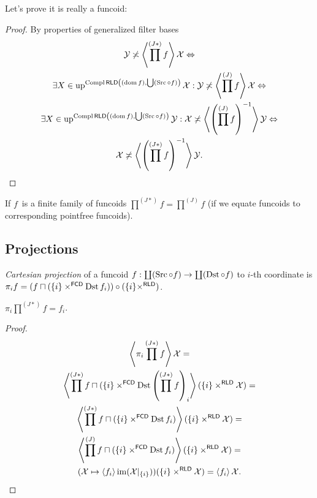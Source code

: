 Let's prove it is really a funcoid:

\begin{proof}
By properties of generalized filter bases
\begin{multline*}
\mathcal{Y}\not\asymp\left\langle \prod^{(J\ast)} f\right\rangle\mathcal{X}
\Leftrightarrow\\
\exists X\in\operatorname{up}^{\operatorname{Compl}\mathsf{RLD}\left((\operatorname{dom} f),\bigcup(\operatorname{Src}\circ f)\right)}\mathcal{X}:
\mathcal{Y}\not\asymp\left\langle \prod^{(J)}f\right\rangle\mathcal{X}
\Leftrightarrow\\
\exists X\in\operatorname{up}^{\operatorname{Compl}\mathsf{RLD}\left((\operatorname{dom} f),\bigcup(\operatorname{Src}\circ f)\right)}\mathcal{Y}:
\mathcal{X}\not\asymp\left\langle \left(\prod^{(J)}f\right)^{-1}\right\rangle\mathcal{Y}
\Leftrightarrow\\
\mathcal{X}\not\asymp
\left\langle \left(\prod^{(J\ast)} f\right)^{-1}\right\rangle\mathcal{Y}.
\end{multline*}
\end{proof}

\begin{obvious}
If $f$~is a finite family of funcoids $\prod^{(J\ast)}f=\prod^{(J)}f$ (if we equate funcoids to corresponding pointfree funcoids).
\end{obvious}

\subsection{Projections}

\begin{defn}
\emph{Cartesian projection} of a funcoid $f: \coprod(\operatorname{Src}\circ f)\to\coprod(\operatorname{Dst}\circ f)$ to $i$-th coordinate is
$\pi_i f=
(f\sqcap(\{i\}\times^{\mathsf{FCD}}\operatorname{Dst} f_i))\circ
(\{i\}\times^{\mathsf{RLD}})$.
\end{defn}

\begin{thm}
$\pi_i\prod^{(J\ast)}f=f_i$.
\end{thm}

\begin{proof}
\begin{multline*}
\left\langle \pi_i\prod^{(J\ast)}f\right\rangle\mathcal{X} =\\
\left\langle \prod^{(J\ast)}f\sqcap(\{i\}\times^{\mathsf{FCD}}\operatorname{Dst} \left(\prod^{(J\ast)}f\right)_i\right\rangle(\{i\}\times^{\mathsf{RLD}}\mathcal{X})=\\
\left\langle \prod^{(J\ast)}f\sqcap(\{i\}\times^{\mathsf{FCD}}\operatorname{Dst} f_i)\right\rangle(\{i\}\times^{\mathsf{RLD}}\mathcal{X})=\\
\left\langle \prod^{(J)}f\sqcap(\{i\}\times^{\mathsf{FCD}}\operatorname{Dst} f_i)\right\rangle(\{i\}\times^{\mathsf{RLD}}\mathcal{X})=\\
(\mathcal{X}\mapsto\left\langle f_i\right\rangle\operatorname{im}(\mathcal{X}|_{\{i\}}))(\{i\}\times^{\mathsf{RLD}}\mathcal{X})=
\left\langle f_i\right\rangle\mathcal{X}.
\end{multline*}
\end{proof}